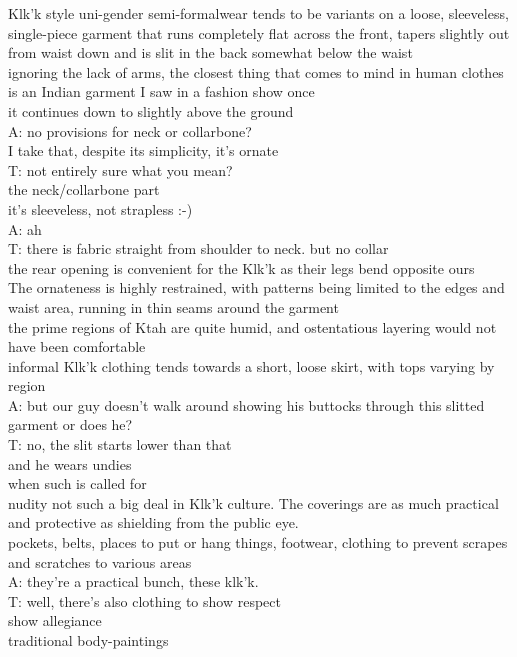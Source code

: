 Klk'k style uni-gender semi-formalwear tends to be variants on a loose, sleeveless, single-piece garment that runs completely flat across the front, tapers slightly out from waist down and is slit in the back somewhat below the waist \\
ignoring the lack of arms, the closest thing that comes to mind in human clothes is an Indian garment I saw in a fashion show once\\
it continues down to slightly above the ground\\
A: no provisions for neck or collarbone?\\
I take that, despite its simplicity, it's ornate\\
T: not entirely sure what you mean?\\
the neck/collarbone part\\
it's sleeveless, not strapless :-)\\
A: ah\\
T: there is fabric straight from shoulder to neck. but no collar\\
the rear opening is convenient for the Klk'k as their legs bend opposite ours\\
The ornateness is highly restrained, with patterns being limited to the edges and waist area, running in thin seams around the garment\\
the prime regions of Ktah are quite humid, and ostentatious layering would not have been comfortable\\
informal Klk'k clothing tends towards a short, loose skirt, with tops varying by region\\
A: but our guy doesn't walk around showing his buttocks through this slitted garment or does he?\\
T: no, the slit starts lower than that\\
and he wears undies\\
when such is called for\\
nudity not such a big deal in Klk'k culture. The coverings are as much practical and protective as shielding from the public eye.\\
pockets, belts, places to put or hang things, footwear, clothing to prevent scrapes and scratches to various areas\\
A: they're a practical bunch, these klk'k.\\
T: well, there's also clothing to show respect\\
show allegiance\\
traditional body-paintings\\
